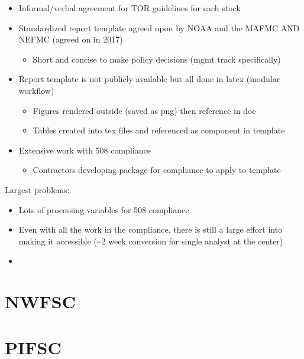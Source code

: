 \documentclass[
  letterpaper,
  DIV=11,
  numbers=noendperiod]{scrreprt}
\providecommand{\tightlist}{%
  \setlength{\itemsep}{0pt}\setlength{\parskip}{0pt}}\usepackage{longtable,booktabs,array}
\begin{document}
\begin{itemize}
\item
  Informal/verbal agreement for TOR guidelines for each stock
\item
  Standardized report template agreed upon by NOAA and the MAFMC AND
  NEFMC (agreed on in 2017)

  \begin{itemize}
  \tightlist
  \item
    Short and concise to make policy decisions (mgmt track specifically)
  \end{itemize}
\item
  Report template is not publicly available but all done in latex
  (modular workflow)

  \begin{itemize}
  \item
    Figures rendered outside (saved as png) then reference in doc
  \item
    Tables created into tex files and referenced as component in
    template
  \end{itemize}
\item
  Extensive work with 508 compliance

  \begin{itemize}
  \tightlist
  \item
    Contractors developing package for compliance to apply to template
  \end{itemize}
\end{itemize}

Largest problems:

\begin{itemize}
\item
  Lots of processing variables for 508 compliance
\item
  Even with all the work in the compliance, there is still a large
  effort into making it accessible (\textasciitilde2 week conversion for
  single analyst at the center)
\item
\end{itemize}

\section{NWFSC}\label{sec-nwfsc}

\section{PIFSC}\label{sec-pifsc}
\end{document}
